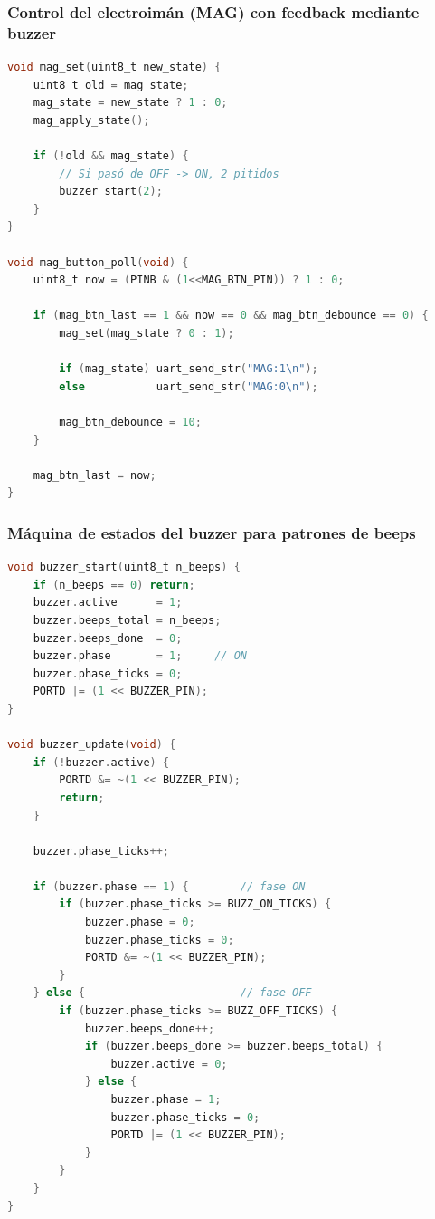\subsubsection{Control del electroimán (MAG) con feedback mediante buzzer}\label{ap:mag_control}
\begin{lstlisting}[language=C]
void mag_set(uint8_t new_state) {
    uint8_t old = mag_state;
    mag_state = new_state ? 1 : 0;
    mag_apply_state();

    if (!old && mag_state) {
        // Si pasó de OFF -> ON, 2 pitidos
        buzzer_start(2);
    }
}

void mag_button_poll(void) {
    uint8_t now = (PINB & (1<<MAG_BTN_PIN)) ? 1 : 0;

    if (mag_btn_last == 1 && now == 0 && mag_btn_debounce == 0) {
        mag_set(mag_state ? 0 : 1);

        if (mag_state) uart_send_str("MAG:1\n");
        else           uart_send_str("MAG:0\n");

        mag_btn_debounce = 10;
    }

    mag_btn_last = now;
}
\end{lstlisting}

\subsubsection{Máquina de estados del buzzer para patrones de beeps}\label{ap:buzzer_fsm}
\begin{lstlisting}[language=C]
void buzzer_start(uint8_t n_beeps) {
    if (n_beeps == 0) return;
    buzzer.active      = 1;
    buzzer.beeps_total = n_beeps;
    buzzer.beeps_done  = 0;
    buzzer.phase       = 1;     // ON
    buzzer.phase_ticks = 0;
    PORTD |= (1 << BUZZER_PIN);
}

void buzzer_update(void) {
    if (!buzzer.active) {
        PORTD &= ~(1 << BUZZER_PIN);
        return;
    }

    buzzer.phase_ticks++;

    if (buzzer.phase == 1) {        // fase ON
        if (buzzer.phase_ticks >= BUZZ_ON_TICKS) {
            buzzer.phase = 0;
            buzzer.phase_ticks = 0;
            PORTD &= ~(1 << BUZZER_PIN);
        }
    } else {                        // fase OFF
        if (buzzer.phase_ticks >= BUZZ_OFF_TICKS) {
            buzzer.beeps_done++;
            if (buzzer.beeps_done >= buzzer.beeps_total) {
                buzzer.active = 0;
            } else {
                buzzer.phase = 1;
                buzzer.phase_ticks = 0;
                PORTD |= (1 << BUZZER_PIN);
            }
        }
    }
}
\end{lstlisting}


